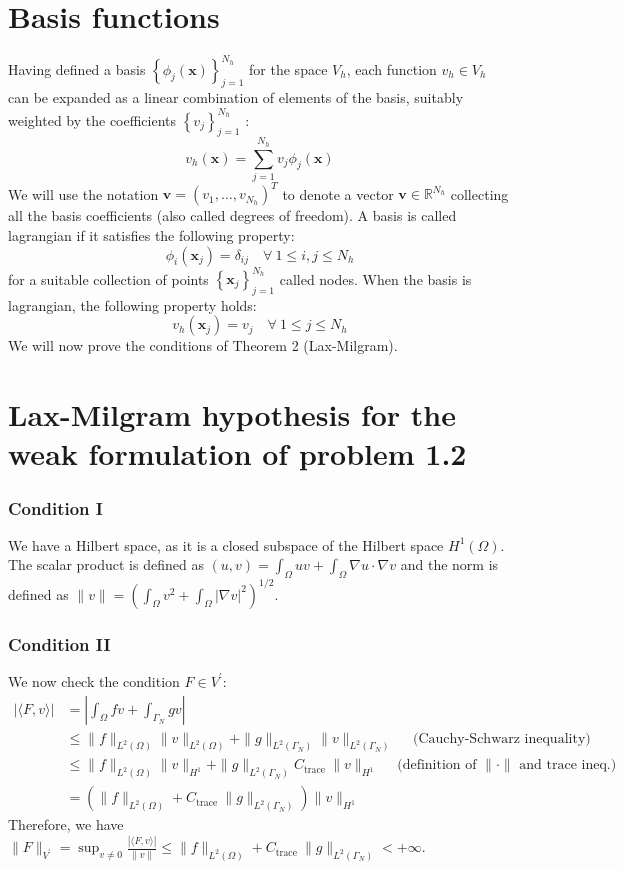 \documentclass[11pt]{book}
\begin{document}
\section*{Basis functions}
Having defined a basis $\left\{\phi_{j}(\mathbf{x})\right\}_{j=1}^{N_{h}}$ for the space $V_{h}$, each function $v_{h} \in V_{h}$ can be expanded as a linear combination of elements of the basis, suitably weighted by the coefficients $\left\{v_{j}\right\}_{j=1}^{N_{h}}$ :
$$
v_{h}(\mathbf{x})=\sum_{j=1}^{N_{h}} v_{j} \phi_{j}(\mathbf{x})
$$
We will use the notation $\mathbf{v}=\left(v_{1}, \ldots, v_{N_{h}}\right)^{T}$ to denote a vector $\mathbf{v} \in \mathbb{R}^{N_{h}}$ collecting all the basis coefficients (also called degrees of freedom). A basis is called lagrangian if it satisfies the following property:
$$
\phi_{i}\left(\mathbf{x}_{j}\right)=\delta_{i j} \quad \forall \ 1 \leq i, j \leq N_{h}
$$
for a suitable collection of points $\left\{\mathbf{x}_{j}\right\}_{j=1}^{N_{h}}$ called nodes. When the basis is lagrangian, the following property holds:
$$
v_{h}\left(\mathbf{x}_{j}\right)=v_{j} \quad \forall \ 1 \leq j \leq N_{h}
$$
We will now prove the conditions of Theorem 2 (Lax-Milgram).
\section{Lax-Milgram hypothesis for the weak formulation of problem 1.2}
\subsubsection*{Condition I}
We have a Hilbert space, as it is a closed subspace of the Hilbert space $H^{1}(\Omega)$. 
The scalar product is defined as $(u, v)=\int_{\Omega} u v+\int_{\Omega} \nabla u \cdot \nabla v$ and the norm is defined as $\|v\|=\left(\int_{\Omega} v^{2}+\int_{\Omega}|\nabla v|^{2}\right)^{1 / 2}$.
\subsubsection*{Condition II} \vspace{-0.4cm}
We now check the condition $F \in V^{\prime}$:
\begin{align*}
|\langle F, v\rangle| & =\left|\int_{\Omega} f v+\int_{\Gamma_{N}} g v\right| \\
& \leq\|f\|_{L^{2}(\Omega)}\|v\|_{L^{2}(\Omega)}+\|g\|_{L^{2}\left(\Gamma_{N}\right)}\|v\|_{L^{2}\left(\Gamma_{N}\right)} \quad \text { (Cauchy-Schwarz inequality) } \\
& \leq\|f\|_{L^{2}(\Omega)}\|v\|_{H^1}+\|g\|_{L^{2}\left(\Gamma_{N}\right)} C_{\text {trace }}\|v\|_{H^1} \quad \text { (definition of }\|\cdot\| \text { and trace ineq.) } \\
& =\left(\|f\|_{L^{2}(\Omega)}+C_{\text {trace }}\|g\|_{L^{2}\left(\Gamma_{N}\right)}\right)\|v\|_{H^1}
\end{align*}\vspace{-0.5cm}
Therefore, we have $\|F\|_{V^{\prime}}=\sup _{v \neq 0} \frac{|\langle F, v\rangle|}{\|v\|} \leq\|f\|_{L^{2}(\Omega)}+C_{\text {trace }}\|g\|_{L^{2}\left(\Gamma_{N}\right)}<+\infty$.
\end{document}
